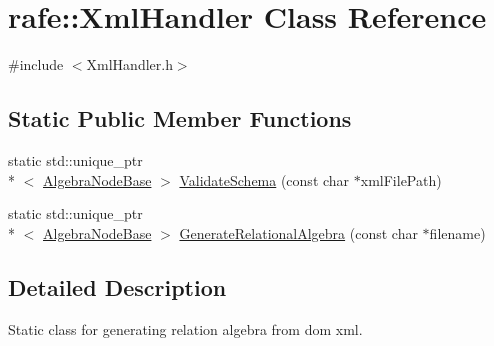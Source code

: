 \hypertarget{classrafe_1_1_xml_handler}{\section{rafe\+:\+:Xml\+Handler Class Reference}
\label{classrafe_1_1_xml_handler}
}


{\ttfamily \#include $<$Xml\+Handler.\+h$>$}

\subsection*{Static Public Member Functions}
\begin{DoxyCompactItemize}
\item 
static std\+::unique\+\_\+ptr\\*
$<$ \hyperlink{classrafe_1_1_algebra_node_base}{Algebra\+Node\+Base} $>$ \hyperlink{classrafe_1_1_xml_handler_ab1edfc4be74e2553cfa96bbc92ad91c3}{Validate\+Schema} (const char $\ast$xml\+File\+Path)
\item 
static std\+::unique\+\_\+ptr\\*
$<$ \hyperlink{classrafe_1_1_algebra_node_base}{Algebra\+Node\+Base} $>$ \hyperlink{classrafe_1_1_xml_handler_a4045f6c818eb92e84fc902f3057717a7}{Generate\+Relational\+Algebra} (const char $\ast$filename)
\end{DoxyCompactItemize}


\subsection{Detailed Description}
Static class for generating relation algebra from dom xml. 

